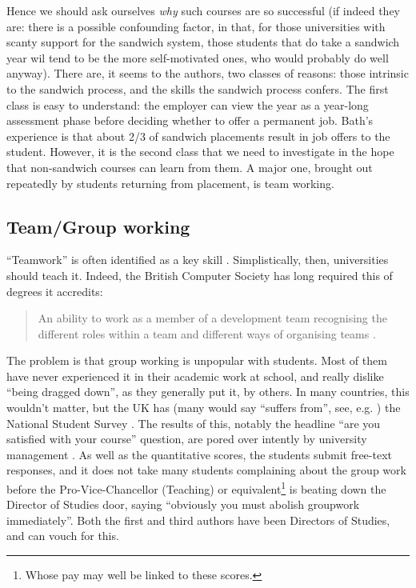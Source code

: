 \documentclass[sigconf,anonymous]{acmart}
\begin{document}
Hence we should ask ourselves \emph{why} such courses are so
successful (if indeed they are: there is a possible confounding
factor, in that, for those universities with scanty support for the
sandwich system, those students that do take a sandwich year wil tend
to be the more self-motivated ones, who would probably do well
anyway).  %
There are, it seems to the
authors, two classes of reasons: those intrinsic to the sandwich
process, and the skills the sandwich process confers. The first class
is easy to understand: the employer can view the year as a year-long
assessment phase before deciding whether to offer a permanent
job. Bath's experience is that about 2/3 of sandwich placements result
in job offers to the student. However, it is the second class that we
need to investigate in the hope that non-sandwich courses can learn from them. A major one, brought out repeatedly by students
returning from placement, is team working.

\subsection{Team/Group working}

``Teamwork'' is often identified as a key skill \cite[and many
others]{ArcherDavidson2008}. Simplistically, then, universities should
teach it. Indeed, the British Computer Society has long required this
of degrees it accredits:
\begin{quote} An ability to work as a member of a development team
recognising the different roles within a team and different ways of
organising teams \cite[Requirement 2.3.1]{BCS2018a}.
\end{quote}
The problem is that group working is unpopular with students. Most of them have never experienced it in their academic work at school, and really dislike ``being dragged down'', as they generally put it, by others. In many countries, this wouldn't matter, but the UK has (many would say ``suffers from'', see, e.g. \cite{Cupples2015a}) the National Student Survey \cite{OfS2018a}. The results of this, notably the headline ``are you satisfied with your course'' question, are pored over intently by university management \cite[Myth 3]{OfS2018a}. As well as the quantitative scores, the students submit free-text responses, and it does not take many students complaining about the group work before the Pro-Vice-Chancellor (Teaching) or equivalent\footnote{Whose pay may well be linked to these scores.} is beating down the Director of Studies door, saying ``obviously you must abolish groupwork immediately''. Both the first and third authors have been Directors of Studies, and can vouch for this.
\end{document}
